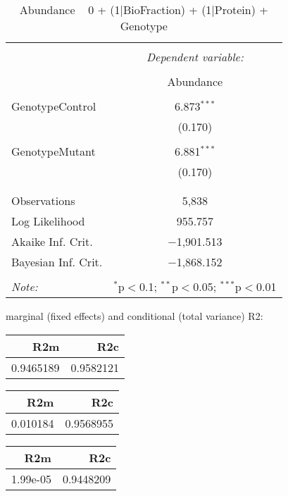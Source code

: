 \documentclass[11pt]{report}
\begin{document}
\begin{table}[!htbp] \centering 
  \caption{Abundance ~ 0 + (1|BioFraction) + (1|Protein) + Genotype} 
  \label{} 
\begin{tabular}{@{\extracolsep{5pt}}lc} 
\\[-1.8ex]\hline 
\hline \\[-1.8ex] 
 & \multicolumn{1}{c}{\textit{Dependent variable:}} \\ 
\cline{2-2} 
\\[-1.8ex] & Abundance \\ 
\hline \\[-1.8ex] 
 GenotypeControl & 6.873$^{***}$ \\ 
  & (0.170) \\ 
  & \\ 
 GenotypeMutant & 6.881$^{***}$ \\ 
  & (0.170) \\ 
  & \\ 
\hline \\[-1.8ex] 
Observations & 5,838 \\ 
Log Likelihood & 955.757 \\ 
Akaike Inf. Crit. & $-$1,901.513 \\ 
Bayesian Inf. Crit. & $-$1,868.152 \\ 
\hline 
\hline \\[-1.8ex] 
\textit{Note:}  & \multicolumn{1}{r}{$^{*}$p$<$0.1; $^{**}$p$<$0.05; $^{***}$p$<$0.01} \\ 
\end{tabular} 
\end{table} 
marginal (fixed effects) and conditional (total variance) R2:

\begin{tabular}{r|r}
\hline
R2m & R2c\\
\hline
0.9465189 & 0.9582121\\
\hline
\end{tabular}

\begin{tabular}{r|r}
\hline
R2m & R2c\\
\hline
0.010184 & 0.9568955\\
\hline
\end{tabular}

\begin{tabular}{r|r}
\hline
R2m & R2c\\
\hline
1.99e-05 & 0.9448209\\
\hline
\end{tabular}
\end{document}
